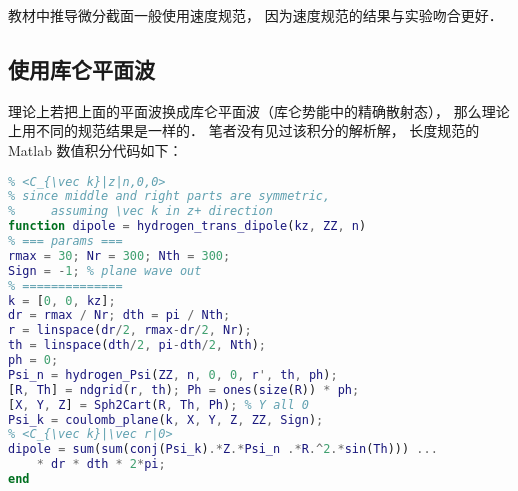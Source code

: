 教材中推导微分截面一般使用速度规范， 因为速度规范的结果与实验吻合更好．

\subsection{使用库仑平面波}

理论上若把上面的平面波换成库仑平面波（库仑势能中的精确散射态）， 那么理论上用不同的规范结果是一样的． 笔者没有见过该积分的解析解， 长度规范的 Matlab 数值积分代码如下：

\begin{lstlisting}[language=matlab, caption=hydrogen\_trans\_dipole.m]
% exact hydrogen transition dipole with Coulomb plane wave
% <C_{\vec k}|z|n,0,0>
% since middle and right parts are symmetric,
%     assuming \vec k in z+ direction
function dipole = hydrogen_trans_dipole(kz, ZZ, n)
% === params ===
rmax = 30; Nr = 300; Nth = 300;
Sign = -1; % plane wave out
% ==============
k = [0, 0, kz];
dr = rmax / Nr; dth = pi / Nth;
r = linspace(dr/2, rmax-dr/2, Nr);
th = linspace(dth/2, pi-dth/2, Nth); 
ph = 0;
Psi_n = hydrogen_Psi(ZZ, n, 0, 0, r', th, ph);
[R, Th] = ndgrid(r, th); Ph = ones(size(R)) * ph;
[X, Y, Z] = Sph2Cart(R, Th, Ph); % Y all 0
Psi_k = coulomb_plane(k, X, Y, Z, ZZ, Sign);
% <C_{\vec k}|\vec r|0>
dipole = sum(sum(conj(Psi_k).*Z.*Psi_n .*R.^2.*sin(Th))) ...
    * dr * dth * 2*pi;
end
\end{lstlisting}

